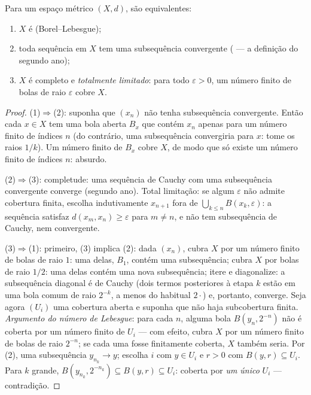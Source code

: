 \begin{theorem}
\label{thm:b3:topology:metriccompact}
Para um espaço métrico $(X, d)$, são
equivalentes:
\begin{enumerate}
  \item $X$ é  (Borel--Lebesgue);
  \item toda sequência em $X$ tem uma subsequência convergente
        ( --- a definição do segundo ano);
  \item $X$ é completo e \emph{totalmente limitado}: para todo
        $\varepsilon > 0$, um número finito de bolas de raio $\varepsilon$ cobre $X$.
\end{enumerate}
\end{theorem}

\begin{proof}
(1)$\Rightarrow$(2): suponha que $(x_n)$ não tenha subsequência
convergente. Então cada $x \in X$ tem uma bola aberta $B_x$ que contém
$x_n$ apenas para um número finito de índices $n$ (do
contrário, uma subsequência convergiria para $x$: tome os raios
$1/k$). Um número finito de $B_x$ cobre $X$, de modo que só
existe um número finito de índices $n$: absurdo.

(2)$\Rightarrow$(3): completude: uma sequência de Cauchy com uma subsequência
convergente converge (segundo ano). Total limitação: se algum $\varepsilon$ não
admite cobertura finita, escolha indutivamente $x_{n+1}$ fora de $\bigcup_{k\leq n} B(x_k, \varepsilon)$: a
sequência satisfaz $d(x_m, x_n) \geq \varepsilon$ para $m \neq n$, e não tem subsequência de Cauchy,
nem convergente.

(3)$\Rightarrow$(1): primeiro, (3) implica (2): dada $(x_n)$, cubra $X$
por um número finito de bolas de raio $1$: uma delas, $B_1$,
contém uma subsequência; cubra $X$ por bolas de raio $1/2$: uma
delas contém uma nova subsequência; itere e diagonalize: a subsequência
diagonal é de Cauchy (dois termos posteriores à etapa $k$ estão em
uma bola comum de raio $2^{-k}$, a menos do habitual $2\cdot$) e,
portanto, converge. Seja agora $(U_i)$ uma cobertura aberta e
suponha que não haja subcobertura finita. \emph{Argumento do número de
Lebesgue}: para cada $n$, alguma bola $B(y_n, 2^{-n})$ não é coberta por um
número finito de $U_i$ --- com efeito, cubra $X$ por um número
finito de bolas de raio $2^{-n}$; se cada uma fosse finitamente
coberta, $X$ também seria. Por (2), uma subsequência $y_{n_k} \to y$; escolha
$i$ com $y \in U_i$ e $r > 0$ com $B(y, r) \subseteq U_i$. Para $k$ grande, $B(y_{n_k}, 2^{-n_k}) \subseteq B(y, r) \subseteq U_i$:
coberta por \emph{um único} $U_i$ --- contradição.
\end{proof}

